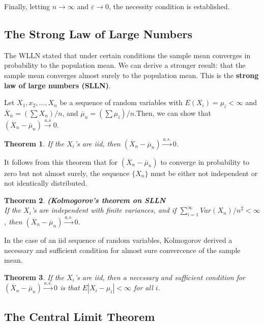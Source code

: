\documentclass{article}
\newtheorem{theorem}{Theorem}[section]
\begin{document}
Finally, letting \(n \rightarrow \infty\) and \(\varepsilon \rightarrow 0\), the necessity condition is established.

\subsection{The Strong Law of Large Numbers}

The WLLN stated that under certain conditions the sample mean converges in probability to the population mean. We can derive a stronger result: that the sample mean converges almost surely to the population mean. This is the \textbf{strong law of large numbers (SLLN)}. 

Let \(X_1,x_2,\dots,X_n\) be a sequence of random variables with \(E(X_i)=\mu_i<\infty\) and \(\overline{X}_n=(\sum X_n)/n\), and \(\overline{\mu}_n=(\sum \mu_i)/n\).Then, we can show that \((\overline{X}_n-\overline{\mu}_n) \stackrel{a.s} \longrightarrow 0\).

\begin{theorem}
    If the \(X_i\)'s are iid, then \((\overline{X}_n-\overline{\mu}_n) \stackrel{a.s.} \longrightarrow 0\).
\end{theorem}

It follows from this theorem that for \((\overline{X}_n-\overline{\mu}_n)\) to converge in probability to zero but not almost surely, the sequence \(\{X_n\}\) must be either not independent or not identically distributed.

\begin{theorem}
    \textbf{(Kolmogorov's theorem on SLLN}\\
    If the \(X_i\)'s are independent with finite variances, and if \(\sum_{i=1}^{\infty}Var(X_n)/n^2<\infty\), then \((\overline{X}_n-\overline{\mu}_n) \stackrel{a.s.} \longrightarrow 0\).
\end{theorem}

In the case of an iid sequence of random variables, Kolmogorov derived a necessary and sufficient condition for almost sure convercence of the sample mean.

\begin{theorem}
    If the \(X_i\)'s are iid, then a necessary and sufficient condition for \((\overline{X}_n-\overline{\mu}_n) \stackrel{a.s.} \longrightarrow 0\) is that \(E|X_i-\mu_i|<\infty\) for all $i$.
\end{theorem}

\subsection{The Central Limit Theorem}
\end{document}

